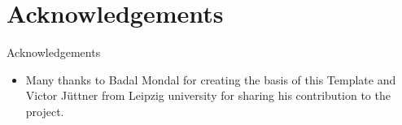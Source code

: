 \section{Acknowledgements}
\begin{frame}{Acknowledgements}
\begin{itemize}
    \item Many thanks to 
Badal Mondal for creating the basis of this Template and Victor J\"uttner from Leipzig university for sharing his contribution to the project.
\end{itemize}
\end{frame}